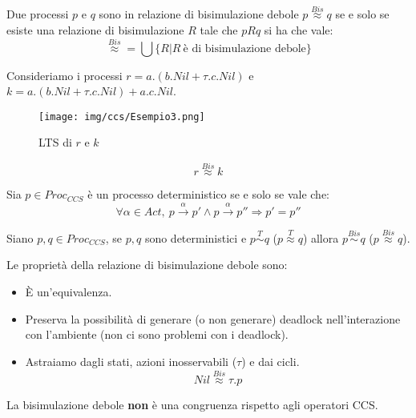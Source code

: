 Due processi $p$ e $q$ sono in relazione di bisimulazione debole $p
    \stackrel{Bis}{\approx} q$
se e solo se esiste una relazione di bisimulazione $R$ tale che $p R q$ si ha che vale:
\begin{equation}
    \stackrel{Bis}{\approx} = \bigcup \{R | R \ \text{è di bisimulazione debole}\}
\end{equation}
\begin{esempio}
    Consideriamo i processi $r = a . (b . Nil + \tau . c . Nil)$
    e $k = a . (b . Nil + \tau . c . Nil) + a . c . Nil$.
    \begin{figure}[!ht]
        \centering
        \texttt{[image: img/ccs/Esempio3.png]}
        \caption{LTS di $r$ e $k$}
    \end{figure}
    $$r \stackrel{Bis}{\approx} k$$
\end{esempio}
\begin{definizione}
    Sia $p \in Proc_{CCS}$ è un processo deterministico se e solo se vale che:
    \begin{equation}
        \forall \alpha \in Act, \ p \xrightarrow{\alpha} p' \land p
        \xrightarrow{\alpha} p'' \Rightarrow p' = p''
    \end{equation}
\end{definizione}
\begin{osservazione}
    Siano $p, q \in Proc_{CCS}$, se $p, q$ sono deterministici e $p \stackrel{T}{\sim}
        q$ ($p \stackrel{T}{\approx} q$) allora $p \stackrel{Bis}{\sim}
        q$ ($p \stackrel{Bis}{\approx} q$).
\end{osservazione}
\begin{osservazione}
    Le proprietà della relazione di bisimulazione debole sono:
    \begin{itemize}
        \item È un'equivalenza.
        \item Preserva la possibilità di generare (o non generare) deadlock
              nell'interazione con l'ambiente (non ci sono problemi con i deadlock).
        \item Astraiamo dagli stati, azioni inosservabili ($\tau$) e dai cicli.
              \begin{equation}
                  Nil \stackrel{Bis}{\approx} \tau . p
              \end{equation}
    \end{itemize}
\end{osservazione}
La bisimulazione debole \textbf{non} è una congruenza rispetto agli operatori CCS.
